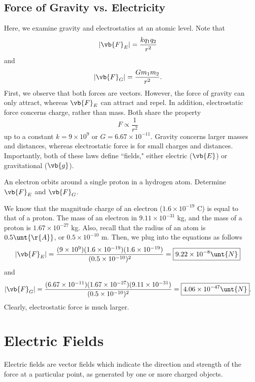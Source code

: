 \documentclass[11pt]{article}
\begin{document}
\subsection{Force of Gravity vs. Electricity}
Here, we examine gravity and electrostatics at an atomic level. Note that
\begin{equation}
	|\vb{F}_E| = \frac{kq_1q_2}{r^2}
\end{equation}
and
\begin{equation}
	|\vb{F}_G| = \frac{Gm_1m_2}{r^2}.
\end{equation}
First, we observe that both forces are vectors. However, the force of gravity can only attract, whereas $\vb{F}_E$ can attract and repel. In addition, electrostatic force concerns charge, rather than mass. Both share the property \[F \propto \frac{1}{r^2}\] up to a constant $k = 9\times 10^9$ or $G = 6.67\times 10^{-11}$. Gravity concerns larger masses and distances, whereas electrostatic force is for small charges and distances. Importantly, both of these laws define ``fields," either electric ($\vb{E}$) or gravitational ($\vb{g}$).
\begin{example}
	An electron orbits around a single proton in a hydrogen atom. Determine $\vb{F}_E$ and $\vb{F}_G$.	
\end{example}
\begin{solution}
	We know that the magnitude charge of an electron ($1.6\times10^{-19}$ C) is equal to that of a proton. The mass of an electron in $9.11\times 10^{-31}$ kg, and the mass of a proton is $1.67\times10^{-27}$ kg. Also, recall that the radius of an atom is $0.5\unt{\r{A}}$, or $0.5 \times 10^{-10}$ m. Then, we plug into the equations as follows
	\begin{equation*}
		|\vb{F}_E| = \frac{(9 \times 10^9)(1.6\times 10^{-19})(1.6\times10^{-19})}{(0.5\times 10^{-10})^2} = \boxed{9.22 \times 10^{-8}\unt{N}}
	\end{equation*}
	and
	\begin{equation*}
		|\vb{F}_G| = \frac{(6.67\times10^{-11})(1.67\times 10^{-27})(9.11\times10^{-31})}{(0.5\times 10^{-10})^2} = \boxed{4.06 \times 10^{-47}\unt{N}}.
	\end{equation*}
	Clearly, electrostatic force is much larger.
\end{solution}
\section{Electric Fields}
Electric fields are vector fields which indicate the direction and strength of the force at a particular point, as generated by one or more charged objects.
\end{document}
